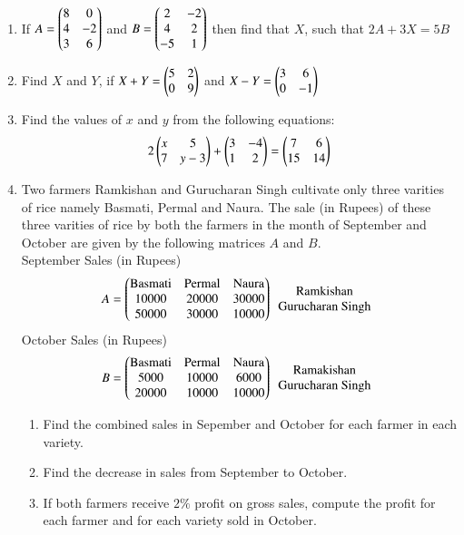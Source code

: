 \documentclass{article}
\theoremstyle{remark}
\begin{document}
\begin{enumerate}
\item If $A=\begin{pmatrix}8&0\\ 4&-2\\3&6\end{pmatrix}$ and $B=\begin{pmatrix}2&-2\\4&2\\-5&1\end{pmatrix}$ then find that $X$, such that $2A+3X=5B$
\item Find $X$ and $Y$, if $X+Y=\begin{pmatrix}5&2\\0&9\end{pmatrix}$ and $X-Y=\begin{pmatrix}3&6\\0&-1\end{pmatrix}$
\item Find the values of $x$ and $y$ from the following equations:
\begin{align} 2 \begin{pmatrix}x&5\\7&y-3\end{pmatrix}+\begin{pmatrix}3&-4\\1&2\end{pmatrix}=\begin{pmatrix}7&6\\15&14\end{pmatrix} \end{align}
\item Two farmers Ramkishan and Gurucharan Singh cultivate only three varities of rice namely Basmati, Permal and Naura. The sale (in Rupees) of these three varities of rice by both the farmers in the month of September and October are given by the following matrices $A$ and $B$.
 \\ September Sales (in Rupees)
\begin{align}
A=\begin{pmatrix} \text{Basmati} & \text{Permal} & \text{Naura}\\ 10000&20000&30000\\50000&30000&10000\end{pmatrix} \begin{array}{c}\text{Ramkishan}\\ \text{Gurucharan Singh}\end{array}
\end{align}
  October Sales (in Rupees)
\begin{align}
B=\begin{pmatrix}\text{Basmati}& \text{Permal} &\text{Naura}\\5000&10000&6000\\20000&10000&10000\end{pmatrix}\begin{array}{c}\text{Ramakishan} \\ \text{Gurucharan Singh}\end{array}
\end{align}
\begin{enumerate}[label=(\roman*)]
\item Find the combined sales in Sepember and October for each farmer in each variety.
\item Find the decrease in sales from September to October.
\item If both farmers receive $2\%$  profit on gross sales, compute the profit for each farmer and for each variety sold in October.

\end{enumerate}
\end{enumerate}
\end{document}
